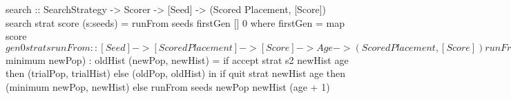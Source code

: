 search :: SearchStrategy -> Scorer -> [Seed]
       -> (Scored Placement, [Score])
search strat score (s:seeds) = runFrom seeds firstGen [] 0
 where
  firstGen = map score $ gen0 strat s
  runFrom :: [Seed] -> [Scored Placement] -> [Score]
          -> Age -> (Scored Placement, [Score])
  runFrom (s1:s2:seeds) oldPop oldHist age =
    let trialPop  = nextGen strat s1 score oldPop
        trialHist = (scoreOf $ minimum newPop) : oldHist
        (newPop, newHist) =
          if accept strat s2 newHist age then
            (trialPop, trialHist)
          else
            (oldPop, oldHist)
    in  if quit strat newHist age then
          (minimum newPop, newHist)
        else
          runFrom seeds newPop newHist (age + 1)
